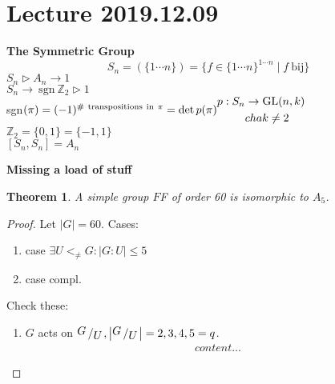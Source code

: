 \documentclass{article}
\let\ddd\cdots
\newcommand{\Z}{\mathbb{Z}}
\newcommand{\quotient}[2]{{\raisebox{.2em}{$#1$}\left/\raisebox{-.2em}{$#2$}\right.}}
\newcommand{\abs}[1]{\left|#1\right|}
\newcommand{\tsupgp}{\triangleright}
\newtheorem{theorem}{Theorem}[section]
\theoremstyle{definition}
\theoremstyle{remark}
\theoremstyle{example}
\begin{document}
	\section*{Lecture 2019.12.09}
	\textbf{The Symmetric Group}
	\[S_n=(\{1 \ddd n\})=\{f \in \{1 \ddd n\}^{1 \ddd n} \mid f\ \mathrm{bij} \}\]
	$S_n \tsupgp A_n \to 1$\\
	$S_n \to \mathrm{\ sgn\ } \Z_2 \tsupgp 1$\\
	sgn$(\pi)=(-1)^{\mathrm{\#\ transpositions\ in\ } \pi}\\
	=\det p(\pi)\\
	\begin{aligned}
		p:S_n& \to \mathrm{GL}(n,k)\\
		& chak \neq 2
	\end{aligned}$\\
	$\Z_2=\{0,1\}=\{-1,1\}$\\
	$[ S_n , S_n ] =A_n$
	
	\textbf{Missing a load of stuff}
	
	\begin{theorem}
		A simple group $F$F of order 60 is isomorphic to $A_5$.
	\end{theorem}
	\begin{proof}
		Let $\abs{G}=60$. Cases:
		\begin{enumerate}
			\item case $\exists U <_{\neq} G: \abs{G:U} \leq 5$
			\item case compl.
		\end{enumerate}
		Check these:
		\begin{enumerate}
			\item $G$ acts on $\quotient{G}{U},\abs{\quotient{G}{U}}=2,3,4,5=q$.
			\begin{align*}
				content...
			\end{align*}
		\end{enumerate}
	\end{proof}
	
\end{document}
